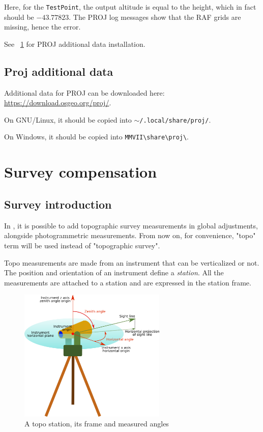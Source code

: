 Here, for the {\tt TestPoint}, the output altitude is equal to the height, which in fact should be $-43.77823$.
The PROJ log messages show that the RAF grids are missing, hence the error.

See ~\ref{ProjData} for PROJ additional data installation.


\section{Proj additional data}
\label{ProjData}
Additional data for PROJ can be downloaded here: \url{https://download.osgeo.org/proj/}.

On GNU/Linux, it should be copied into $\sim${\tt /.local/share/proj/}.

On Windows, it should be copied into {\tt MMVII\textbackslash share\textbackslash proj\textbackslash}.




\chapter{Survey compensation}
\label{Chap:TopoUser}


\section{Survey introduction}

In \CdPPP, it is possible to add topographic survey measurements in global adjustments, alongside photogrammetric measurements. From now on, for convenience, "topo" term will be used instead of "topographic survey".

Topo measurements are made from an instrument that can be verticalized or not.
The position and orientation of an instrument define a \textit{station}.
All the measurements are attached to a station and are expressed in the station frame.

\begin{figure}[!h]
\centering
\includegraphics[width=7cm]{CommandReferences/ImagesComRef/topo.png}
\caption{A topo station, its frame and measured angles}
\label{fig:topoStation}
\end{figure}

